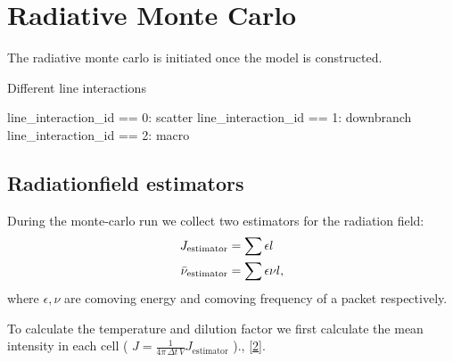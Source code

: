 \documentclass[letterpaper,10pt,english]{sphinxmanual}
\begin{document}
\chapter{Radiative Monte Carlo}
\label{montecarlo:montecarlo}\label{montecarlo::doc}\label{montecarlo:radiative-monte-carlo}
The radiative monte carlo is initiated once the model is constructed.

Different line interactions

line\_interaction\_id == 0: scatter
line\_interaction\_id == 1: downbranch
line\_interaction\_id == 2: macro


\section{Radiationfield estimators}
\label{montecarlo:radiationfield-estimators}
During the monte-carlo run we collect two estimators for the radiation field:
\begin{gather}
\begin{split}J_\textrm{estimator} &= \sum{\epsilon l}\\
\bar{\nu}_\textrm{estimator} &=  \sum{\epsilon \nu l},\end{split}\notag
\end{gather}
where $\epsilon, \nu$ are comoving energy and comoving frequency of a packet respectively.

To calculate the temperature and dilution factor we first calculate the mean intensity in each cell
( $J = \frac{1}{4\pi\, \Delta t\, V} J_\textrm{estimator}$ )., {\hyperref[zreferences:a-a-403-261l]{{[}2{]}}}.
\end{document}
